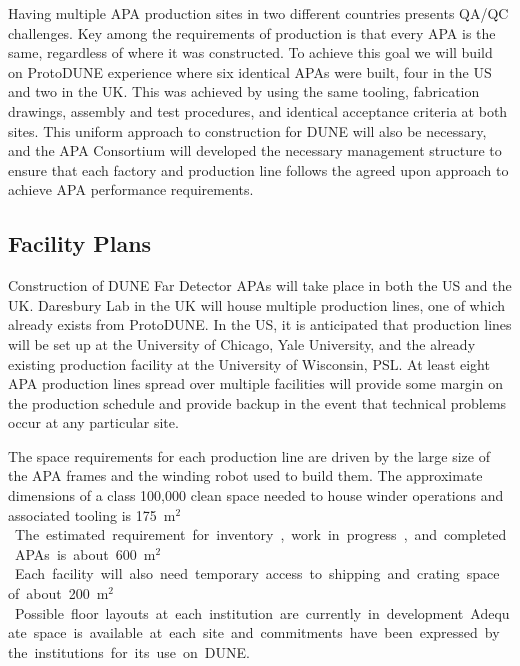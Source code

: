 Having multiple APA production sites in two different countries presents QA/QC challenges. Key among the requirements of production is that every APA is the same, regardless of where it was constructed. To achieve this goal we will build on ProtoDUNE experience where six identical APAs were built, four in the US and two in the UK. This was achieved by using the same tooling, fabrication drawings, assembly and test procedures, and identical acceptance criteria at both sites.  This uniform approach to construction for DUNE will also be necessary, and the APA Consortium will developed the necessary management structure to ensure that each factory and production line follows the agreed upon approach to achieve APA performance requirements.


\subsection{Facility Plans}
\label{sec:fdsp-apa-facility}

Construction of DUNE Far Detector APAs will take place in both the US and the UK. Daresbury Lab in the UK will house multiple production lines, one of which already exists from ProtoDUNE. In the US, it is anticipated that production lines will be set up at the University of Chicago, Yale University, and the already existing production facility at the University of Wisconsin, PSL. At least eight APA production lines spread over multiple facilities will provide some margin on the production schedule and provide backup in the event that technical problems occur at any particular site. 

The space requirements for each production line are driven by the large size of the APA frames and the winding robot used to build them. The approximate dimensions of a class 100,000 clean space needed to house winder operations and associated tooling is \SI{175}{m$^2$}. The estimated requirement for inventory, work in progress, and completed APAs is about \SI{600}{m$^2$}. Each facility will also need temporary access to shipping and crating space of about \SI{200}{m$^2$}. Possible floor layouts at each institution are currently in development. Adequate space is available at each site and commitments have been expressed by the institutions for its use on DUNE. 


